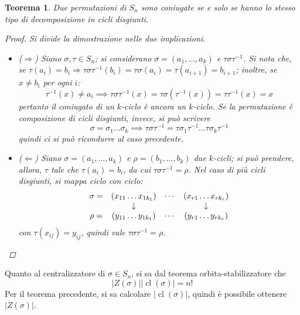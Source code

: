 \documentclass[11pt]{scrartcl}
\theoremstyle{style1}
\newtheorem{teorema}{Teorema}[section]
\numberwithin{equation}{subsection}
\begin{document}
\begin{teorema}
	Due permutazioni di $S_n$ sono coniugate se e solo se hanno lo stesso tipo di decomposizione in cicli disgiunti.
	\begin{proof}
		Si divide la dimostrazione nelle due implicazioni.
		\begin{itemize}
			\item ($\Rightarrow $) Siano $\sigma , \tau \in S_n$; si considerano $\sigma = (a_1, \ldots, a_k)$ e $\tau \sigma \tau ^{-1}$.
				Si nota che, se $\tau (a_i) = b_i\Rightarrow \tau \sigma \tau ^{-1}(b_i) = \tau \sigma (a_i) = \tau (a_{i+1} ) =b_{i+1} $; inoltre, se $x \neq b_i $ per ogni $i$:
				\[
				\tau ^{-1}(x) \neq a_i \implies \tau \sigma \tau ^{-1}(x) = \tau \sigma \left(\tau ^{-1}(x)\right) =\tau \tau ^{-1}(x) = x
				\] 
				pertanto il coniugato di un $k$-ciclo \`e ancora un $k$-ciclo.
				Se la permutazione \`e composizione di cicli disgiunti, invece, si pu\`o scrivere 
				\[
				\sigma = \sigma _1 \ldots\sigma _k \implies \tau \sigma \tau ^{-1}= \tau \sigma _1\tau ^{-1}\ldots \tau \sigma _k\tau ^{-1}
				\] 
				quindi ci si pu\`o ricondurre al caso precedente.
			\item ($\Leftarrow$) Siano $\sigma  = (a_1,\ldots,a_k)$ e $\rho =(b_1,\ldots,b_k)$ due $k$-cicli; si pu\`o prendere, allora, $\tau $ tale che $\tau (a_i) = b_i$, da cui $\tau \sigma \tau ^{-1}=\rho $. 
				Nel caso di pi\`u cicli disgiunti, si mappa ciclo con ciclo:
				\[
				\begin{array}
					{c c c c}
					\sigma = &(x_{11} \ldots x_{1k_1} )&\cdots & (x_{r1} \ldots x_{rk_r} )\\
						 &\downarrow &  & \downarrow\\
					\rho = &(y_{11} \ldots y_{1k_1} ) & \cdots & (y_{r1} \ldots y_{r k_r} )
				\end{array}
				\] 
				con $\tau (x_{ij} ) = y_{ij} $, quindi vale $\tau \sigma \tau ^{-1}=\rho $.
		\end{itemize}
	\end{proof}
\end{teorema}
\noindent Quanto al centralizzatore di $\sigma \in S_n$, si sa dal teorema orbita-stabilizzatore che
\begin{equation}
\lvert Z(\sigma ) \rvert \lvert \operatorname{cl} (\sigma ) \rvert = n!
\end{equation}
Per il teorema precedente, si sa calcolare $\lvert \operatorname{cl} (\sigma ) \rvert $, quindi \`e possibile ottenere $\lvert Z(\sigma ) \rvert $.
\end{document}
